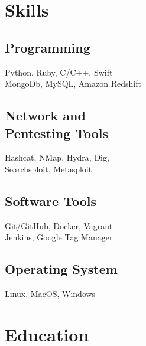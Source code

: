 \documentclass[letterpaper]{deedy-resume} %
\begin{document}
\begin{minipage}[t]{0.30\textwidth} %


\section{Skills}

\subsection{Programming}
Python, Ruby, C/C++, Swift \\
MongoDb, MySQL, Amazon Redshift \\

\sectionspace %

\subsection{Network and \\ Pentesting Tools}
Hashcat, NMap, Hydra, Dig, \\
Searchsploit, Metasploit \\

\sectionspace %

\subsection{Software Tools}
Git/GitHub, Docker, Vagrant \\
Jenkins, Google Tag Manager \\

\sectionspace %

\subsection{Operating System}
Linux, MacOS, Windows \\

\sectionspace %


\section{Education} 


\end{minipage}
\end{document}
